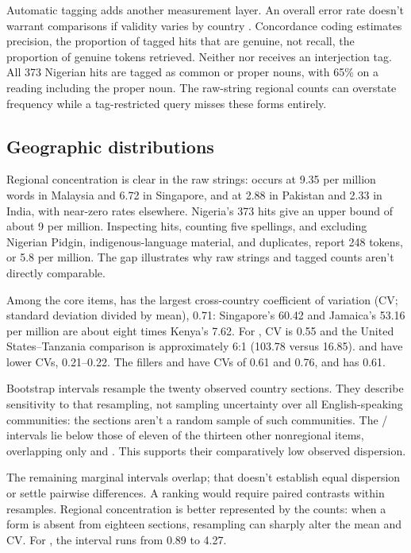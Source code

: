 \documentclass[12pt]{article}
\begin{document}
Automatic tagging adds another measurement layer. An overall error rate doesn't warrant comparisons if validity varies by country \citep{reynolds2026didcorpus}. Concordance coding estimates precision, the proportion of tagged hits that are genuine, not recall, the proportion of genuine tokens retrieved. Neither  nor  receives an interjection tag. All 373 Nigerian  hits are tagged as common or proper nouns, with 65\% on a reading including the proper noun. The raw-string regional counts can overstate frequency while a tag-restricted query misses these forms entirely.

\subsection{Geographic distributions}

Regional concentration is clear in the raw strings:  occurs at 9.35 per million words in Malaysia and 6.72 in Singapore, and  at 2.88 in Pakistan and 2.33 in India, with near-zero rates elsewhere. Nigeria's 373  hits give an upper bound of about 9 per million. Inspecting hits, counting five spellings, and excluding Nigerian Pidgin, indigenous-language material, and duplicates, \textcite[69]{unuabonahdaniel2020} report 248 tokens, or 5.8 per million. The gap illustrates why raw strings and tagged counts aren't directly comparable.

Among the core items,  has the largest cross-country coefficient of variation (CV; standard deviation divided by mean), 0.71: Singapore's 60.42 and Jamaica's 53.16 per million are about eight times Kenya's 7.62. For , CV is 0.55 and the United States--Tanzania comparison is approximately 6:1 (103.78 versus 16.85).  and  have lower CVs, 0.21--0.22. The fillers  and  have CVs of 0.61 and 0.76, and  has 0.61.

Bootstrap intervals resample the twenty observed country sections. They describe sensitivity to that resampling, not sampling uncertainty over all English-speaking communities: the sections aren't a random sample of such communities. The / intervals lie below those of eleven of the thirteen other nonregional items, overlapping only  and . This supports their comparatively low observed dispersion. 

The remaining marginal intervals overlap; that doesn't establish equal dispersion or settle pairwise differences. A ranking would require paired contrasts within resamples. Regional concentration is better represented by the counts: when a form is absent from eighteen sections, resampling can sharply alter the mean and CV. For , the interval runs from 0.89 to 4.27.
\end{document}
